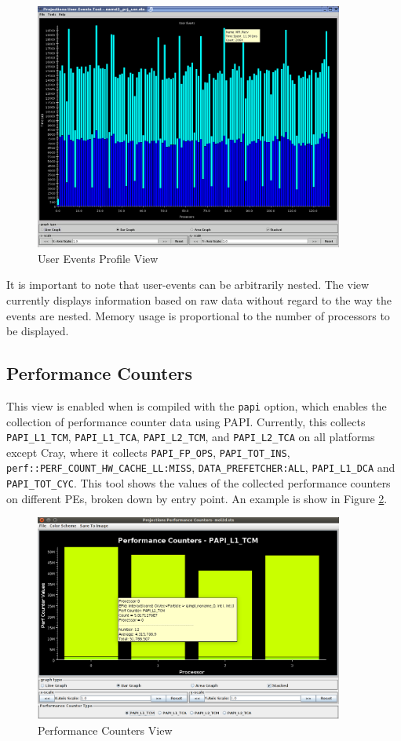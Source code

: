 \documentclass[10pt]{report}
\begin{document}
\begin{figure}[htb]
\center
\includegraphics[width=4.0in]{fig/apoa1_128_userEventsView}
\caption{User Events Profile View}
\label{user event profile}
\end{figure}

It is important to note that user-events can be arbitrarily
nested. The view currently displays information based on raw data
without regard to the way the events are nested. Memory usage is
proportional to the number of processors to be displayed.

\subsection{Performance Counters}

This view is enabled when \charmpp{} is compiled with the {\tt papi}
option, which enables the collection of performance counter data using
PAPI. Currently, this collects {\tt PAPI\_L1\_TCM}, {\tt PAPI\_L1\_TCA},
{\tt PAPI\_L2\_TCM}, and {\tt PAPI\_L2\_TCA} on all platforms except
Cray, where it collects {\tt PAPI\_FP\_OPS}, {\tt PAPI\_TOT\_INS},
{\tt perf::PERF\_COUNT\_HW\_CACHE\_LL:MISS}, {\tt DATA\_PREFETCHER:ALL},
{\tt PAPI\_L1\_DCA} and {\tt PAPI\_TOT\_CYC}. This tool shows the
values of the collected performance counters on different PEs, broken
down by entry point.  An example is show in Figure \ref{performance counters}.

\begin{figure}[!ht]
\center
\includegraphics[width=4.0in]{fig/performancecounters}
\caption{Performance Counters View}
\label{performance counters}
\end{figure}
\end{document}
